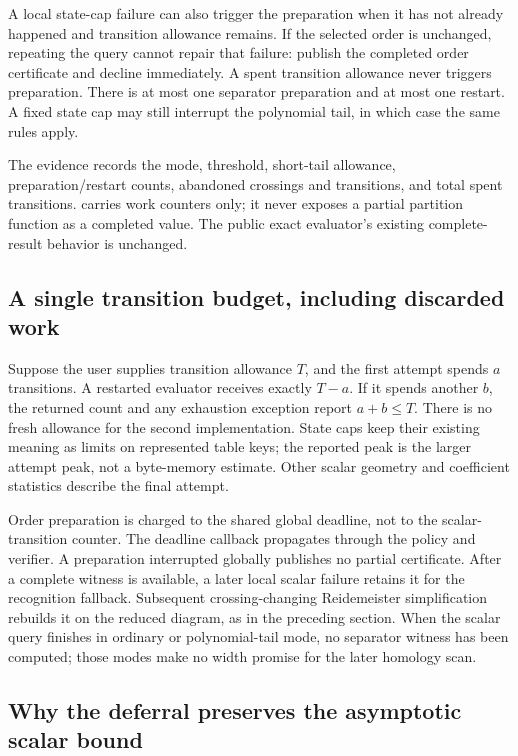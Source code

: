 A local state-cap failure can also trigger the preparation when it has not
already happened and transition allowance remains.  If the selected order
is unchanged, repeating the query cannot repair that failure: publish the
completed order certificate and decline immediately.  A spent transition
allowance never triggers preparation.  There is at most one separator
preparation and at most one restart.  A fixed state cap may still interrupt
the polynomial tail, in which case the same rules apply.

The  evidence records the mode, threshold, short-tail
allowance, preparation/restart counts, abandoned crossings and transitions,
and total spent transitions.   carries work counters only;
it never exposes a partial partition function as a completed value.  The
public exact evaluator's existing complete-result behavior is unchanged.

\subsection{A single transition budget, including discarded work}

Suppose the user supplies transition allowance $T$, and the first attempt
spends $a$ transitions.  A restarted evaluator receives exactly $T-a$.
If it spends another $b$, the returned count and any exhaustion exception
report $a+b\le T$.  There is no fresh allowance for the second implementation.
State caps keep their existing meaning as limits on represented table keys;
the reported peak is the larger attempt peak, not a byte-memory estimate.
Other scalar geometry and coefficient statistics describe the final attempt.

Order preparation is charged to the shared global deadline, not to the
scalar-transition counter.  The deadline callback propagates through the
policy and verifier.  A preparation interrupted globally publishes no partial
certificate.  After a complete witness is available, a later local scalar
failure retains it for the recognition fallback.  Subsequent crossing-changing
Reidemeister simplification rebuilds it on the reduced diagram, as in the
preceding section.  When the scalar query finishes in ordinary or
polynomial-tail mode, no separator witness has been computed; those modes
make no width promise for the later homology scan.

\subsection{Why the deferral preserves the asymptotic scalar bound}

